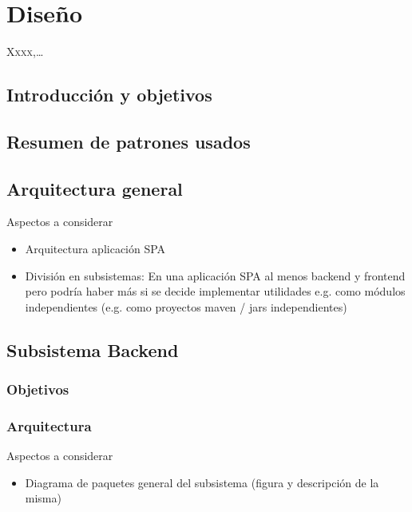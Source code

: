 \chapter{Diseño}
\label{chap:deseño}

\lettrine{X}{xxx},\dots

 
\section{Introducción y objetivos}

\section{Resumen de patrones usados}

\section{Arquitectura general}

{ \color{red} Aspectos a considerar
    \begin{itemize}
      \item Arquitectura aplicación SPA
      \item División en subsistemas: En una aplicación SPA al menos backend y frontend pero podría haber más si se decide implementar utilidades e.g. como módulos independientes (e.g. como proyectos maven / jars independientes)
    \end{itemize}
}
\section{Subsistema Backend}

\subsection{Objetivos}

\subsection{Arquitectura}

{ \color{red} Aspectos a considerar
    \begin{itemize}
      \item Diagrama de paquetes general del subsistema (figura y descripción de la misma)
    \end{itemize}
}

